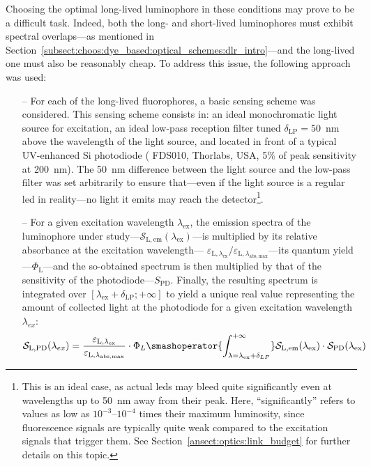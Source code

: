 Choosing the optimal long-lived luminophore in these conditions may prove to be a difficult task. Indeed, both the long- and short-lived luminophores must exhibit spectral overlaps---as mentioned in Section~\ref{subsect:choos:dye_based:optical_schemes:dlr_intro}---and the long-lived one must also be reasonably cheap. To address this issue, the following approach was used:
\begin{itemize}
	\item[--] For each of the long-lived fluorophores, a basic sensing scheme was considered. This sensing scheme consists in: an ideal monochromatic light source for excitation, an ideal low-pass reception filter tuned $\delta_\mathrm{LP}=50$~nm above the wavelength of the light source, and located in front of a typical UV-enhanced Si photodiode (\eg{} FDS010, Thorlabs, USA, 5\% of peak sensitivity at 200~nm). The 50~nm difference between the light source and the low-pass filter was set arbitrarily to ensure that---even if the light source is a regular \gls{led} in reality---no light it emits may reach the detector\footnote{This is an ideal case, as actual \glspl{led} may bleed quite significantly even at wavelengths up to 50~nm away from their peak. Here, \enquote{significantly} refers to values as low as $10^{-3}$--$10^{-4}$ times their maximum luminosity, since fluorescence signals are typically quite weak compared to the excitation signals that trigger them. See Section~\ref{ansect:optics:link_budget} for further details on this topic.}.
	\item[--] For a given excitation wavelength $\lambda_\mathrm{ex}$, the emission spectra of the luminophore under study---$\mathcal{S}_\mathrm{L,em}(\lambda_\mathrm{ex})$---is multiplied by its relative absorbance at the excitation wavelength--- $\varepsilon_{\mathrm{L},\lambda_\mathrm{ex}}/\varepsilon_{\mathrm{L},\lambda_\mathrm{abs,max}}$---its quantum yield---$\Phi_\mathrm{L}$---and the so-obtained spectrum is then multiplied by that of the sensitivity of the photodiode---$S_\mathrm{PD}$. Finally, the resulting spectrum is integrated over $\left[ \lambda_\mathrm{ex} + \delta_\mathrm{LP};+\infty \right]$ to yield a unique real value representing the amount of collected light at the photodiode for a given excitation wavelength $\lambda_{ex}$:
	\begin{equation}
		\mathcal{S}_\mathrm{L,PD}(\lambda_{ex}) = \frac{\varepsilon_{\mathrm{L},\lambda_\mathrm{ex}}}{\varepsilon_{\mathrm{L},\lambda_\mathrm{abs,max}}} \cdot \Phi_L \smashoperator{\int_{\lambda = \lambda_\mathrm{ex} + \delta_{LP}}^{+ \infty}} \mathcal{S}_\mathrm{L,em}(\lambda_\mathrm{ex}) \cdot \mathcal{S}_\mathrm{PD}(\lambda_\mathrm{ex})

\end{equation}
\end{itemize}
